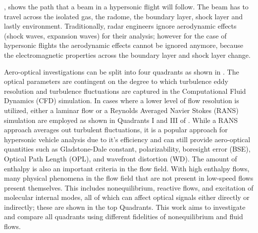         , shows the path that a beam in a hypersonic flight will follow. The beam has to travel across the isolated gas, the radome, the boundary layer, shock layer and lastly environment. Traditionally, radar engineers ignore aerodynamic effects (shock waves, expansion waves) for their analysis; however for the case of hypersonic flights the aerodynamic effects cannot be ignored anymore, because the electromagnetic properties across the boundary layer and shock layer change.   

        Aero-optical investigations can be split into four quadrants as shown
        in . The optical parameters are
        contingent on the degree to which turbulence eddy resolution and
        turbulence fluctuations are captured in the Computational Fluid
        Dynamics (CFD) simulation. In cases where a lower level of flow
        resolution is utilized, either a laminar flow or a Reynolds Averaged
        Navier Stokes (RANS) simulation are employed as shown in Quadrants I
        and III of . While a RANS approach
        averages out turbulent fluctuations, it is a popular approach for
        hypersonic vehicle analysis due to it’s efficiency \cite{Candler2019}
        and can still provide aero-optical quantities such as Gladstone-Dale
        constant, polarizability, boresight error (BSE), Optical Path Length (OPL), and wavefront distortion (WD). The amount of enthalpy is also an important criteria in the flow field. With high enthalpy flows, many physical phenomena in the flow field that are not present in low-speed flows present themselves. This includes nonequilibrium, reactive flows, and excitation of molecular internal modes, all of which can affect optical signals either directly or indirectly; these are shown in the top Quadrants. This work aims to investigate and compare all quadrants using different fidelities of nonequilibrium and fluid flows.\\
